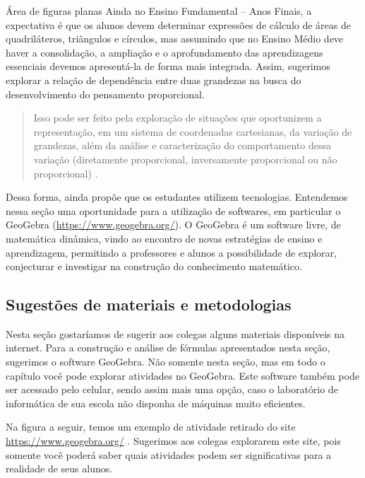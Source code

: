\begin{paginatexto}{Área de figuras planas}
Ainda no Ensino Fundamental – Anos Finais, a expectativa é que os alunos devem determinar expressões de cálculo de áreas de quadriláteros, triângulos e círculos, mas assumindo que no Ensino Médio deve haver a consolidação, a ampliação e o aprofundamento das aprendizagens essenciais devemos apresentá-la de forma mais integrada. Assim, sugerimos explorar a relação de dependência entre duas grandezas na busca do desenvolvimento do pensamento proporcional.

\begin{quote}
  Isso pode ser feito pela exploração de situações que oportunizem a representação, em um sistema de coordenadas cartesianas, da variação de grandezas, além da análise e caracterização do comportamento dessa variação (diretamente proporcional, inversamente proporcional ou não proporcional) \citep[p. 528]{BNCC2019}.
 \end{quote}

Dessa forma, \citet{BNCC2019} ainda propõe que os estudantes utilizem tecnologias. Entendemos nessa seção uma oportunidade para a utilização de softwares, em particular o GeoGebra (\url{https://www.geogebra.org/}). O GeoGebra é um software livre, de matemática dinâmica, vindo ao encontro de novas estratégias de ensino e aprendizagem, permitindo a professores e alunos a possibilidade de explorar, conjecturar e investigar na construção do conhecimento matemático.

\subsection{Sugestões de materiais e metodologias}

Nesta seção gostaríamos de sugerir aos colegas alguns materiais disponíveis na internet. Para a construção e análise de fórmulas apresentados nesta seção, sugerimos o software GeoGebra. Não somente nesta seção, mas em todo o capítulo você pode explorar atividades no GeoGebra. Este software também pode ser acessado pelo celular, sendo assim mais uma opção, caso o laboratório de informática de sua escola não disponha de máquinas muito eficientes.

Na figura a seguir, temos um exemplo de atividade retirado do site \url{https://www.geogebra.org/} . Sugerimos aos colegas explorarem este site, pois somente você poderá saber quais atividades podem ser significativas para a realidade de seus alunos. 

\begin{figure}[H]
\centering


\end{figure}
\end{paginatexto}
